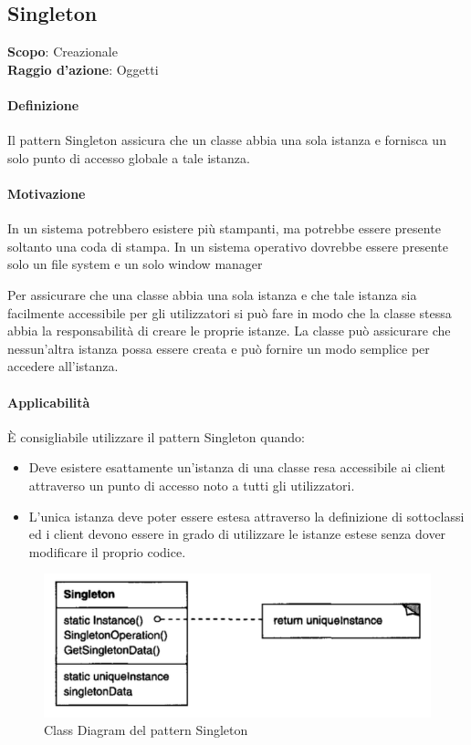 \subsection{Singleton}
\label{singleton}

\textbf{Scopo}: Creazionale \\
\textbf{Raggio d'azione}: Oggetti

\paragraph{Definizione} Il pattern Singleton assicura che un classe abbia una sola istanza e fornisca un solo punto di accesso globale a tale istanza.

\paragraph{Motivazione} In un sistema potrebbero esistere più stampanti, ma potrebbe essere presente soltanto una coda di stampa. In un sistema operativo dovrebbe essere presente solo un file system e un solo window manager

Per assicurare che una classe abbia una sola istanza e che tale istanza sia facilmente accessibile per gli utilizzatori si può fare in modo che la classe stessa abbia la responsabilità di creare le proprie istanze. La classe può assicurare che nessun’altra istanza possa essere creata e può fornire un modo semplice per accedere all’istanza.

\paragraph{Applicabilità} È consigliabile utilizzare il pattern Singleton quando:
\begin{itemize}
    \item Deve esistere esattamente un’istanza di una classe resa accessibile ai client attraverso un punto di accesso noto a tutti gli utilizzatori.
    \item L’unica istanza deve poter essere estesa attraverso la definizione di sottoclassi ed i client devono essere in grado di utilizzare le istanze estese senza dover modificare il proprio codice.
\end{itemize}

\begin{figure}[H]
    \centering
    \includegraphics[width=0.4\linewidth]{assets/pattern/singleton/singleton-struttura.png}
    \caption{Class Diagram del pattern Singleton}
\end{figure}

